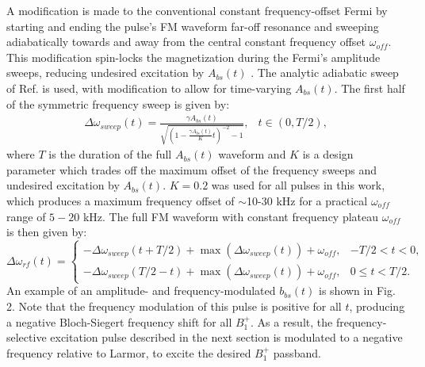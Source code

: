 \documentclass[a4paper,12pt]{article}
\newcommand{\bbst}{b_{bs}(t)}
\begin{document}
\par A modification is made 
to the conventional constant frequency-offset Fermi by starting and ending the pulse's FM waveform
far-off resonance and sweeping adiabatically towards and away from the central constant frequency offset $\omega_{off}$. 
This modification spin-locks the magnetization during the Fermi's amplitude sweeps, reducing undesired excitation by $A_{bs}(t)$ \cite{Garwood2001TheNMR, KhalighiAdiabaticMapping}.
The analytic adiabatic sweep of Ref. \cite{KhalighiAdiabaticMapping} is used, 
with modification to allow for time-varying $A_{bs}(t)$.
The first half of the symmetric frequency sweep is given by:
\begin{equation*}
    \begin{array}{ll}
    \Delta\omega_{sweep}(t) = \frac{\gamma A_{bs}(t)}{\sqrt{\left(1-\frac{\gamma A_{bs}(t)}{K}t\right)^{-2}-1}}, & t \in \left(0, T/2\right), \end{array}
\end{equation*}
where $T$ is the duration of the full $A_{bs}(t)$ waveform and $K$ is a design parameter which trades off the maximum offset of the frequency sweeps and undesired excitation by $A_{bs}(t)$.
$K = 0.2$ was used for all pulses in this work, 
which produces a maximum frequency offset of $\sim$10-30 kHz for a practical $\omega_{off}$ range of $5-20$ kHz. 
The full FM waveform with constant frequency plateau $\omega_{off}$ is then given by:
\begin{equation*}
	\Delta\omega_{rf}(t) = \left\{ \begin{array}{rl} 	-\Delta\omega_{sweep}(t+T/2)+\max(\Delta\omega_{sweep}(t))+\omega_{off}, & -T/2<t<0, \\ 
	-\Delta\omega_{sweep}(T/2 - t)+\max(\Delta\omega_{sweep}(t))+\omega_{off}, & 0 \leq t<T/2. \end{array} \right.
\end{equation*}
An example of an amplitude- and frequency-modulated $\bbst$ is shown in Fig. 2.
Note that the frequency modulation of this pulse is positive for all $t$, 
producing a negative Bloch-Siegert frequency shift for all $B_1^+$. 
As a result, the frequency-selective excitation pulse described in the next section is 
modulated to a negative frequency relative to Larmor, 
to excite the desired $B_1^+$ passband.
\end{document}
